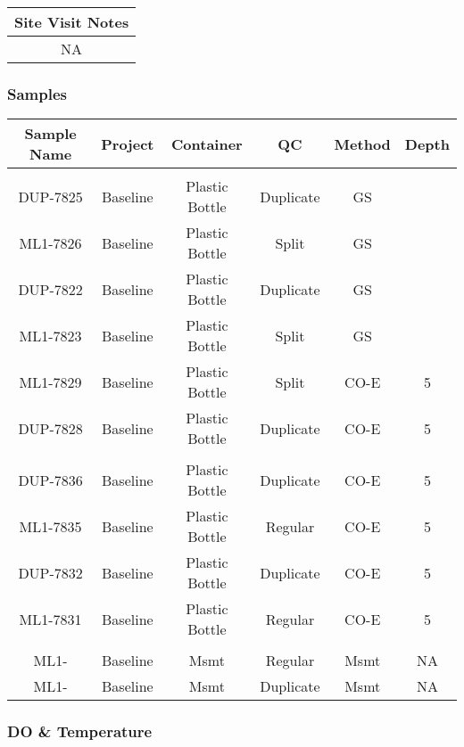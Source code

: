 \documentclass[
  letterpaper,
  DIV=11,
  numbers=noendperiod]{scrartcl}
\begin{document}
\begin{longtable*}{c}
\toprule
Site Visit Notes \\ 
\midrule\addlinespace[2.5pt]
NA \\ 
\bottomrule
\end{longtable*}

\subsubsection{Samples}

\begin{longtable*}{cccccc}
\toprule
Sample Name & Project & Container & QC & Method & Depth \\ 
\midrule\addlinespace[2.5pt]
 \\ 
\midrule\addlinespace[2.5pt]
DUP-7825 & Baseline & Plastic Bottle & Duplicate & GS &  \\ 
ML1-7826 & Baseline & Plastic Bottle & Split & GS &  \\ 
DUP-7822 & Baseline & Plastic Bottle & Duplicate & GS &  \\ 
ML1-7823 & Baseline & Plastic Bottle & Split & GS &  \\ 
ML1-7829 & Baseline & Plastic Bottle & Split & CO-E & 5 \\ 
DUP-7828 & Baseline & Plastic Bottle & Duplicate & CO-E & 5 \\ 
\midrule\addlinespace[2.5pt]
 \\ 
\midrule\addlinespace[2.5pt]
DUP-7836 & Baseline & Plastic Bottle & Duplicate & CO-E & 5 \\ 
ML1-7835 & Baseline & Plastic Bottle & Regular & CO-E & 5 \\ 
DUP-7832 & Baseline & Plastic Bottle & Duplicate & CO-E & 5 \\ 
ML1-7831 & Baseline & Plastic Bottle & Regular & CO-E & 5 \\ 
\midrule\addlinespace[2.5pt]
 \\ 
\midrule\addlinespace[2.5pt]
ML1- & Baseline & Msmt & Regular & Msmt & NA \\ 
ML1- & Baseline & Msmt & Duplicate & Msmt & NA \\ 
\bottomrule
\end{longtable*}

\subsubsection{DO \& Temperature}
\end{document}

